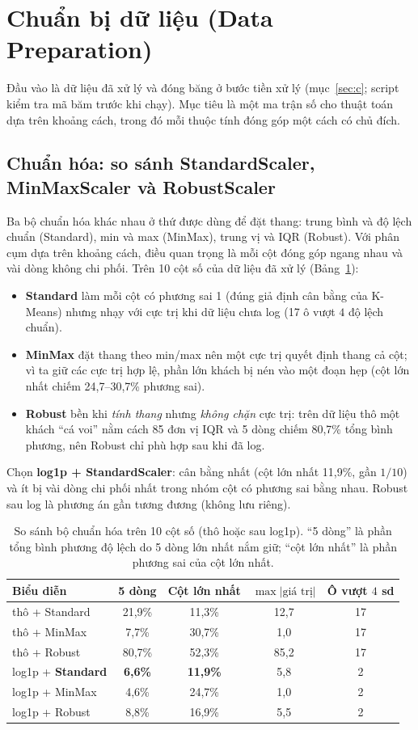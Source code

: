 \section{Chuẩn bị dữ liệu (Data Preparation)}
\label{sec:d}

Đầu vào là dữ liệu đã xử lý và đóng băng ở bước tiền xử lý (mục~\ref{sec:c}; script kiểm tra mã băm trước khi chạy). Mục tiêu là một ma trận số cho thuật toán dựa trên khoảng cách, trong đó mỗi thuộc tính đóng góp một cách có chủ đích.

\subsection{Chuẩn hóa: so sánh StandardScaler, MinMaxScaler và RobustScaler}
Ba bộ chuẩn hóa khác nhau ở thứ được dùng để đặt thang: trung bình và độ lệch chuẩn (Standard), min và max (MinMax), trung vị và IQR (Robust). Với phân cụm dựa trên khoảng cách, điều quan trọng là mỗi cột đóng góp ngang nhau và vài dòng không chi phối.
Trên 10 cột số của dữ liệu đã xử lý (Bảng~\ref{tab:scaler}):
\begin{itemize}
\item \textbf{Standard} làm mỗi cột có phương sai 1 (đúng giả định cân bằng của K-Means) nhưng nhạy với cực trị khi dữ liệu chưa log (17 ô vượt $4$ độ lệch chuẩn).
\item \textbf{MinMax} đặt thang theo min/max nên một cực trị quyết định thang cả cột; vì ta giữ các cực trị hợp lệ, phần lớn khách bị nén vào một đoạn hẹp (cột lớn nhất chiếm 24,7--30,7\% phương sai).
\item \textbf{Robust} bền khi \emph{tính thang} nhưng \emph{không chặn} cực trị: trên dữ liệu thô một khách ``cá voi'' nằm cách 85 đơn vị IQR và 5 dòng chiếm 80,7\% tổng bình phương, nên Robust chỉ phù hợp sau khi đã log.
\end{itemize}
Chọn \textbf{log1p + StandardScaler}: cân bằng nhất (cột lớn nhất 11,9\%, gần $1/10$) và ít bị vài dòng chi phối nhất trong nhóm cột có phương sai bằng nhau. Robust sau log là phương án gần tương đương (không lưu riêng).

\begin{table}[htbp]
\centering\small
\caption{So sánh bộ chuẩn hóa trên 10 cột số (thô hoặc sau log1p). ``5 dòng'' là phần tổng bình phương độ lệch do 5 dòng lớn nhất nắm giữ; ``cột lớn nhất'' là phần phương sai của cột lớn nhất.}
\label{tab:scaler}
\begin{tabular}{lcccc}
\toprule
Biểu diễn & 5 dòng & Cột lớn nhất & $\max|\text{giá trị}|$ & Ô vượt $4$ sd\\
\midrule
thô + Standard & 21,9\% & 11,3\% & 12,7 & 17\\
thô + MinMax & 7,7\% & 30,7\% & 1,0 & 17\\
thô + Robust & 80,7\% & 52,3\% & 85,2 & 17\\
log1p + \textbf{Standard} & \textbf{6,6\%} & \textbf{11,9\%} & 5,8 & 2\\
log1p + MinMax & 4,6\% & 24,7\% & 1,0 & 2\\
log1p + Robust & 8,8\% & 16,9\% & 5,5 & 2\\
\bottomrule
\end{tabular}
\end{table}

